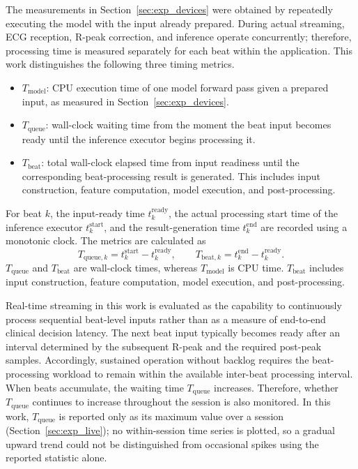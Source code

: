 The measurements in Section~\ref{sec:exp_devices} were obtained by repeatedly executing the model with the input already prepared. During actual streaming, ECG reception, R-peak correction, and inference operate concurrently; therefore, processing time is measured separately for each beat within the application. This work distinguishes the following three timing metrics.
\begin{itemize}
\item $T_{\mathrm{model}}$: CPU execution time of one model forward pass given a prepared input, as measured in Section~\ref{sec:exp_devices}.
\item $T_{\mathrm{queue}}$: wall-clock waiting time from the moment the beat input becomes ready until the inference executor begins processing it.
\item $T_{\mathrm{beat}}$: total wall-clock elapsed time from input readiness until the corresponding beat-processing result is generated. This includes input construction, feature computation, model execution, and post-processing.
\end{itemize}

For beat $k$, the input-ready time $t^{\mathrm{ready}}_k$, the actual processing start time of the inference executor $t^{\mathrm{start}}_k$, and the result-generation time $t^{\mathrm{end}}_k$ are recorded using a monotonic clock. The metrics are calculated as
\begin{equation}
T_{\mathrm{queue},k}
=
t^{\mathrm{start}}_k - t^{\mathrm{ready}}_k,
\qquad
T_{\mathrm{beat},k}
=
t^{\mathrm{end}}_k - t^{\mathrm{ready}}_k.
\label{eq:tbeat}
\end{equation}
$T_{\mathrm{queue}}$ and $T_{\mathrm{beat}}$ are wall-clock times, whereas $T_{\mathrm{model}}$ is CPU time. $T_{\mathrm{beat}}$ includes input construction, feature computation, model execution, and post-processing.

Real-time streaming in this work is evaluated as the capability to continuously process sequential beat-level inputs rather than as a measure of end-to-end clinical decision latency. The next beat input typically becomes ready after an interval determined by the subsequent R-peak and the required post-peak samples. Accordingly, sustained operation without backlog requires the beat-processing workload to remain within the available inter-beat processing interval. When beats accumulate, the waiting time $T_{\mathrm{queue}}$ increases. Therefore, whether $T_{\mathrm{queue}}$ continues to increase throughout the session is also monitored. In this work, $T_{\mathrm{queue}}$ is reported only as its maximum value over a session (Section~\ref{sec:exp_live}); no within-session time series is plotted, so a gradual upward trend could not be distinguished from occasional spikes using the reported statistic alone.

